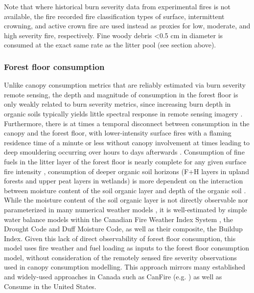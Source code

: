 \documentclass[, manuscript]{copernicus}
\begin{document}
Note that where historical burn severity data from experimental fires is
not available, the fire recorded fire classification types of surface,
intermittent crowning, and active crown fire are used instead as proxies
for low, moderate, and high severity fire, respectively. Fine woody
debris \textless0.5 cm in diameter is consumed at the exact same rate as
the litter pool (see section above).

\subsubsection{Forest floor consumption}

Unlike canopy consumption metrics that are reliably estimated via burn
severity remote sensing, the depth and magnitude of consumption in the
forest floor is only weakly related to burn severity metrics, since
increasing burn depth in organic soils typically yields little spectral
response in remote sensing imagery
\citep{frenchQuantifyingSurfaceSeverity2020}. Furthermore, there is at
times a temporal disconnect between consumption in the canopy and the
forest floor, with lower-intensity surface fires with a flaming
residence time of a minute or less
\citep{wottonFlameTemperatureResidence2011} without canopy involvement
at times leading to deep smouldering occurring over hours to days
afterwards
\citep{hudaStudyFuelSmokeDynamics2020, huangDownwardSpreadSmouldering2017}.
Consumption of fine fuels in the litter layer of the forest floor is
nearly complete for any given surface fire intensity
\citep{vanwagnerDuffConsumptionFire1972}, consumption of deeper organic
soil horizons (F+H layers in upland forests and upper peat layers in
wetlands) is more dependent on the interaction between moisture content
of the soil organic layer and depth of the organic soil
\citep{forestrycanadafiredangerratinggroup1992, daviesVegetationStructureFire2016}.
While the moisture content of the soil organic layer is not directly
observable nor parameterized in many numerical weather models
\citep{hanesEvaluationNewMethods2023}, it is well-estimated by simple
water balance models within the Canadian Fire Weather Index System
\citep{vanwagnerDevelopmentStructureCanadian1987}, the Drought Code and
Duff Moisture Code, as well as their composite, the Buildup Index. Given
this lack of direct observability of forest floor consumption, this
model uses fire weather and fuel loading as inputs to the forest floor
consumption model, without consideration of the remotely sensed fire
severity observations used in canopy consumption modelling. This
approach mirrors many established and widely-used approaches in Canada
such as CanFire (e.g. \citet{smyth2026}) as well as Consume
\citep{ottmar1993} in the United States.
\end{document}
